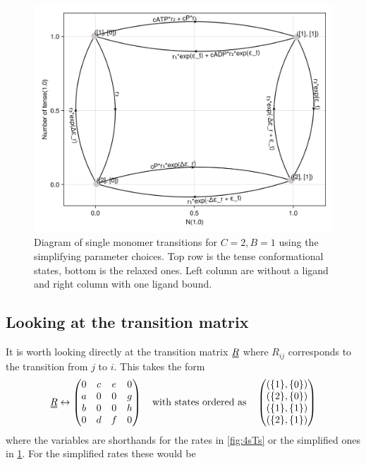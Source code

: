 \documentclass[11pt]{article}
\newcommand\set[1]{\ensuremath{\{#1\}}}
\newcommand{\duf}[2]{\stackunder[0.5pt]{\stackunder[0.8pt]{\stackunder[1pt]{\ensuremath{#1}}{\rule{\widthof{\ensuremath{#2}}*\real{0.9}}{.1ex}}}{\rule{\widthof{\ensuremath{#2}}*\real{0.9}}{.1ex}}}{}}
\newcommand{\du}[1]{\duf{#1}{#1}}
\begin{document}
\begin{figure}[H]
    \includegraphics[width=\textwidth]{../../plots/simple_sg_B=1_C=2_N=1_version=2.5.png}
    \caption{
        Diagram of single monomer transitions for $C=2,B=1$ using the simplifying parameter choices.
        Top row is the tense conformational states, bottom is the relaxed ones.
        Left column are without a ligand and right column with one ligand bound.
    }\label{fig:4sTss}
\end{figure}

\subsection{Looking at the transition matrix}
It is worth looking directly at the transition matrix $\du{R}$ where $R_{ij}$ corresponds to the transition from $j$ to $i$.
This takes the form
\begin{align}
    \du{R} \leftrightarrow \begin{pmatrix}
    0 & c & e & 0 \\
    a & 0 & 0 & g \\
    b & 0 & 0 & h \\
    0 & d & f & 0 \\
    \end{pmatrix} \qq{with states ordered as} \begin{pmatrix}
        (\set{1}, \set{0}) \\
        (\set{2}, \set{0}) \\
        (\set{1}, \set{1}) \\
        (\set{2}, \set{1})
    \end{pmatrix}
\end{align}
where the variables are shorthands for the rates in \cref{fig:4sTs} or the simplified ones in \cref{fig:4sTss}.
For the simplified rates these would be
\end{document}
